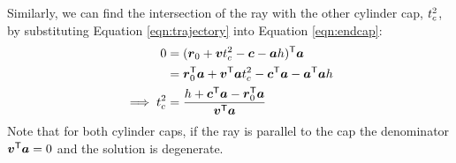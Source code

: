 \documentclass[10pt,letterpaper]{article}
\begin{document}
Similarly, we can find the intersection of the ray with the other cylinder cap, $t_c^2$, by substituting Equation \ref{eqn:trajectory} into Equation \ref{eqn:endcap}:
	\begin{equation}
		\begin{aligned}
			0 &= (\boldsymbol{r}_0 + \boldsymbol{v} t_c^2 - \boldsymbol{c} - \boldsymbol{a}h)^{\mathsf{T}}\boldsymbol{a} \\
			&= \boldsymbol{r}_0^{\mathsf{T}}\boldsymbol{a} + \boldsymbol{v}^{\mathsf{T}}\boldsymbol{a} t_c^2 - \boldsymbol{c}^{\mathsf{T}}\boldsymbol{a} - \boldsymbol{a}^{\mathsf{T}}\boldsymbol{a}h \\
			\implies t_c^2 &= \frac{h + \boldsymbol{c}^{\mathsf{T}}\boldsymbol{a} - \boldsymbol{r}_0^{\mathsf{T}}\boldsymbol{a}}{\boldsymbol{v}^{\mathsf{T}}\boldsymbol{a}}
		\end{aligned}
	\end{equation}	
Note that for both cylinder caps, if the ray is parallel to the cap the denominator $\boldsymbol{v}^{\mathsf{T}}\boldsymbol{a}=0$ and the solution is degenerate.
\end{document}

